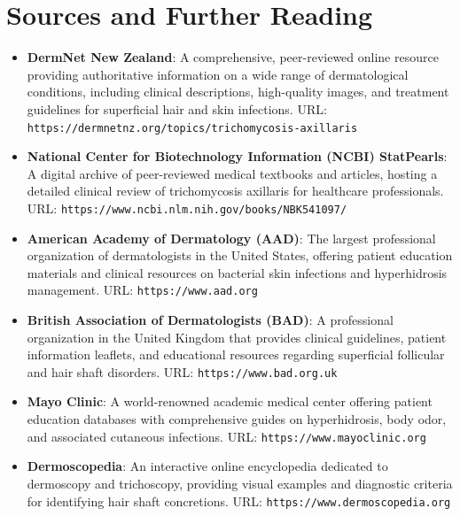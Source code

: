 \section*{Sources and Further Reading}
\begin{itemize}
    \item \textbf{DermNet New Zealand}: A comprehensive, peer-reviewed online resource providing authoritative information on a wide range of dermatological conditions, including clinical descriptions, high-quality images, and treatment guidelines for superficial hair and skin infections. URL: \texttt{https://dermnetnz.org/topics/trichomycosis-axillaris}
    \item \textbf{National Center for Biotechnology Information (NCBI) StatPearls}: A digital archive of peer-reviewed medical textbooks and articles, hosting a detailed clinical review of trichomycosis axillaris for healthcare professionals. URL: \texttt{https://www.ncbi.nlm.nih.gov/books/NBK541097/}
    \item \textbf{American Academy of Dermatology (AAD)}: The largest professional organization of dermatologists in the United States, offering patient education materials and clinical resources on bacterial skin infections and hyperhidrosis management. URL: \texttt{https://www.aad.org}
    \item \textbf{British Association of Dermatologists (BAD)}: A professional organization in the United Kingdom that provides clinical guidelines, patient information leaflets, and educational resources regarding superficial follicular and hair shaft disorders. URL: \texttt{https://www.bad.org.uk}
    \item \textbf{Mayo Clinic}: A world-renowned academic medical center offering patient education databases with comprehensive guides on hyperhidrosis, body odor, and associated cutaneous infections. URL: \texttt{https://www.mayoclinic.org}
    \item \textbf{Dermoscopedia}: An interactive online encyclopedia dedicated to dermoscopy and trichoscopy, providing visual examples and diagnostic criteria for identifying hair shaft concretions. URL: \texttt{https://www.dermoscopedia.org}
\end{itemize}